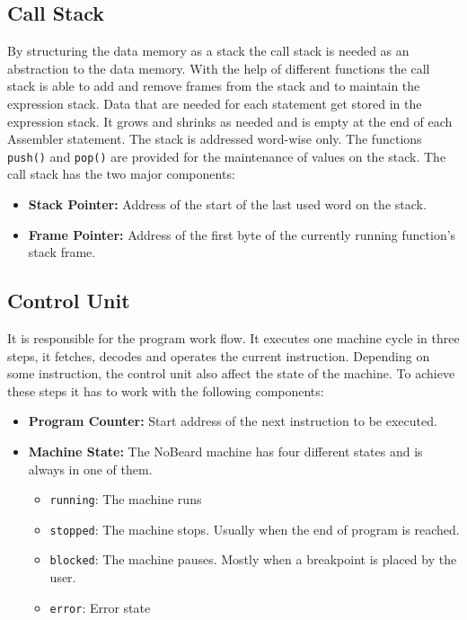 \subsection{Call Stack}
By structuring the data memory as a stack the call stack is needed as an abstraction to the data memory. With the help of different functions the call stack is able to add and remove frames from the stack and to maintain the expression stack. Data that are needed for each statement get stored in the expression stack. It grows and shrinks as needed and is empty at the end of each Assembler statement. The stack is addressed word-wise only. The functions \lstinline$push()$ and \lstinline$pop()$ are provided for the maintenance of values on the stack. The call stack has the two major components:

\begin{itemize}
\item \textbf{Stack Pointer: }Address of the start of the last used word on the stack. 
\item \textbf{Frame Pointer: }Address of the first byte of the currently running function's stack frame. 
\end{itemize}

\subsection{Control Unit}
It is responsible for the program work flow. It executes one machine cycle in three steps, it fetches, decodes and operates the current instruction. Depending on some instruction, the control unit also affect the state of the machine. To achieve these steps it has to work with the following components:

\begin{itemize}
\item \textbf{Program Counter: }Start address of the next instruction to be executed.
\item \textbf{Machine State: }The NoBeard machine has four different states and is always in one of them. 
	\begin{itemize}
		\item \lstinline$running$: The machine runs
		\item \lstinline$stopped$: The machine stops. Usually when the end of program is reached.
		\item \lstinline$blocked$: The machine pauses. Mostly when a breakpoint is placed by the user.
		\item \lstinline$error$: Error state
	\end{itemize}
\end{itemize}

